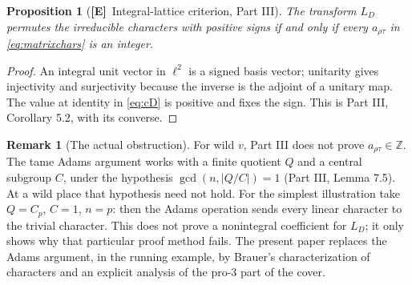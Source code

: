 \documentclass[11pt]{article}
\newcommand{\Z}{\mathbb Z}
\newcommand{\Etag}{\textnormal{\textbf{[E]}}}
\theoremstyle{plain}
\newtheorem{proposition}[theorem]{Proposition}
\theoremstyle{definition}
\newtheorem{remark}[theorem]{Remark}
\begin{document}
\begin{proposition}[\Etag\ Integral-lattice criterion, Part III]\label{prop:int}
The transform $L_D$ permutes the irreducible characters with
positive signs if and only if every $a_{\rho\tau}$ in
\eqref{eq:matrixchars} is an integer.
\end{proposition}
\begin{proof}
An integral unit vector in $\ell^2$ is a signed basis vector;
unitarity gives injectivity and surjectivity because the inverse
is the adjoint of a unitary map.  The value at identity in
\eqref{eq:cD} is positive and fixes the sign.
This is Part III, Corollary 5.2, with its converse.
\end{proof}

\begin{remark}[The actual obstruction]
For wild $v$, Part III does not prove
$a_{\rho\tau}\in\Z$.  The tame Adams argument works with a
finite quotient $Q$ and a central subgroup $C$, under the
hypothesis $\gcd(n,|Q/C|)=1$ (Part III, Lemma 7.5).
At a wild place that hypothesis need not hold.  For the
simplest illustration take $Q=C_p$, $C=1$, $n=p$: then the
Adams operation sends every linear character to the trivial
character.  This does not prove a nonintegral coefficient for
$L_D$; it only shows why that particular proof method fails.
The present paper replaces the Adams argument, in the running
example, by Brauer's characterization of characters and an
explicit analysis of the pro-$3$ part of the cover.
\end{remark}
\end{document}
